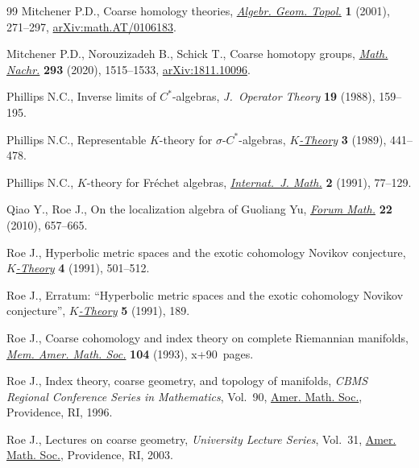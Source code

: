 \documentclass[pdftex]{sigma}
\numberwithin{equation}{section}
\theoremstyle{definition}
\begin{document}
\begin{thebibliography}{99}
Mitchener P.D., Coarse homology theories, \href{https://doi.org/10.2140/agt.2001.1.271}{\textit{Algebr. Geom. Topol.}}
 \textbf{1} (2001), 271--297, \href{https://arxiv.org/abs/math.AT/0106183}{arXiv:math.AT/0106183}.

Mitchener P.D., Norouzizadeh B., Schick T., Coarse homotopy groups,
 \href{https://doi.org/10.1002/mana.201800523}{\textit{Math. Nachr.}} \textbf{293} (2020), 1515--1533, \href{https://arxiv.org/abs/1811.10096}{arXiv:1811.10096}.

Phillips N.C., Inverse limits of {$C^*$}-algebras, \textit{J.~Operator Theory}
 \textbf{19} (1988), 159--195.

Phillips N.C., Representable {$K$}-theory for {$\sigma$}-{$C^*$}-algebras,
 \href{https://doi.org/10.1007/BF00534137}{\textit{$K$-Theory}} \textbf{3} (1989), 441--478.

Phillips N.C., {$K$}-theory for {F}r\'echet algebras, \href{https://doi.org/10.1142/S0129167X91000077}{\textit{Internat.~J.
 Math.}} \textbf{2} (1991), 77--129.

Qiao Y., Roe J., On the localization algebra of {G}uoliang {Y}u, \href{https://doi.org/10.1515/FORUM.2010.036}{\textit{Forum
 Math.}} \textbf{22} (2010), 657--665.

Roe J., Hyperbolic metric spaces and the exotic cohomology {N}ovikov
 conjecture, \href{https://doi.org/10.1007/BF00538881}{\textit{$K$-Theory}} \textbf{4} (1991), 501--512.

Roe J., Erratum: ``{H}yperbolic metric spaces and the exotic cohomology
 {N}ovikov conjecture'', \href{https://doi.org/10.1007/BF01254548}{\textit{$K$-Theory}} \textbf{5} (1991), 189.

Roe J., Coarse cohomology and index theory on complete {R}iemannian manifolds,
 \href{https://doi.org/10.1090/memo/0497}{\textit{Mem. Amer. Math. Soc.}} \textbf{104} (1993), x+90~pages.

Roe J., Index theory, coarse geometry, and topology of manifolds, \textit{CBMS
 Regional Conference Series in Mathematics}, Vol.~90, \href{https://doi.org/10.1090/cbms/090}{Amer. Math. Soc.},
 Providence, RI, 1996.

Roe J., Lectures on coarse geometry, \textit{University Lecture Series},
 Vol.~31, \href{https://doi.org/10.1090/ulect/031}{Amer. Math. Soc.}, Providence, RI, 2003.


\end{thebibliography}
\end{document}
